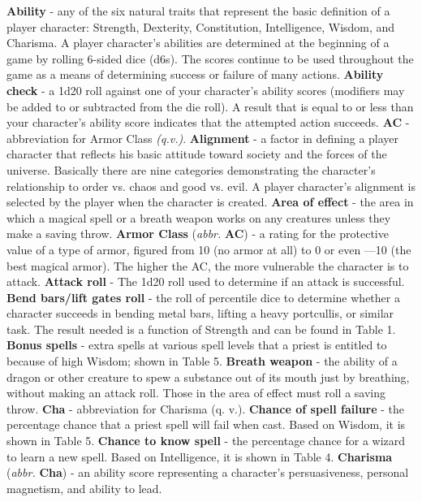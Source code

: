 \documentclass[../main.tex]{subfiles}
\begin{document}
	\begin{multicols}{3}
\textbf{Ability} - any of the six natural traits that represent the basic definition of a player character: Strength, Dexterity, Constitution, Intelligence, Wisdom, and Charisma. A player character's abilities are determined at the beginning of a game by rolling 6-sided dice (d6s). The scores continue to be used throughout the game as a means of determining success or failure of many actions.
\textbf{Ability check} - a 1d20 roll against one of your character's ability scores (modifiers may be added to or subtracted from the die roll). A result that is equal to or less than your character's ability score indicates that the attempted action succeeds.
\textbf{AC} - abbreviation for Armor Class \textit{(q.v.)}.
\textbf{Alignment} - a factor in defining a player character that reflects his basic attitude toward society and the forces of the universe. Basically there are nine categories demonstrating the character's relationship to order vs. chaos and good vs. evil. A player character’s alignment is selected by the player when the character is created.
\textbf{Area of effect} - the area in which a magical spell or a breath weapon works on any creatures unless they make a saving throw.
\textbf{Armor Class} (\textit{abbr.} \textbf{AC}) - a rating for the protective value of a type of armor, figured from 10 (no armor at all) to 0 or even —10 (the best magical armor). The higher the AC, the more vulnerable the character is to attack.
\textbf{Attack roll} - The 1d20 roll used to determine if an attack is successful.
\textbf{Bend bars/lift gates roll} - the roll of percentile dice to determine whether a character succeeds in bending metal bars, lifting a heavy portcullis, or similar task. The result needed is a function of Strength and can be found in Table 1.
\textbf{Bonus spells} - extra spells at various spell levels that a priest is entitled to because of high Wisdom; shown in Table 5.
\textbf{Breath weapon} - the ability of a dragon or other creature to spew a substance out of its mouth just by breathing, without making an attack roll. Those in the area of effect must roll a saving throw.
\textbf{Cha} - abbreviation for Charisma (q. v.).
\textbf{Chance of spell failure} - the percentage chance that a priest spell will fail when cast. Based on Wisdom, it is shown in Table 5.
\textbf{Chance to know spell} - the percentage chance for a wizard to learn a new spell. Based on Intelligence, it is shown in Table 4.
\textbf{Charisma} (\textit{abbr.} \textbf{Cha}) - an ability score representing a character's persuasiveness, personal magnetism, and ability to lead.

\end{multicols}
\end{document}
